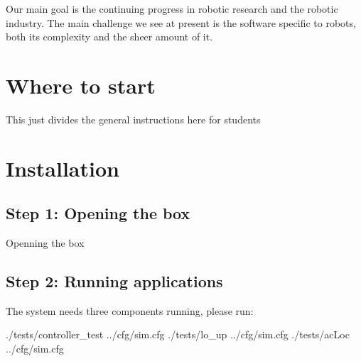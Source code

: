 Our main goal is the continuing progress in robotic research and the robotic industry. The main challenge we see at present is the software specific to robots, both its complexity and the sheer amount of it.\hypertarget{index_ac_doc_index_more_info}{}\section{Where to start}\label{index_ac_doc_index_more_info}

\begin{DoxyItemize}
\item This just divides the general instructions here for students
\end{DoxyItemize}\hypertarget{index_ac_doc_install}{}\section{Installation}\label{index_ac_doc_install}
\hypertarget{index_ac_doc_step1}{}\subsection{Step 1\+: Opening the box}\label{index_ac_doc_step1}
Openning the box\hypertarget{index_ac_doc_step2}{}\subsection{Step 2\+: Running applications}\label{index_ac_doc_step2}
The system needs three components running, please run\+:

\begin{DoxyVerb}./tests/controller_test ../cfg/sim.cfg
./tests/lo_up ../cfg/sim.cfg
./tests/acLoc ../cfg/sim.cfg\end{DoxyVerb}
 